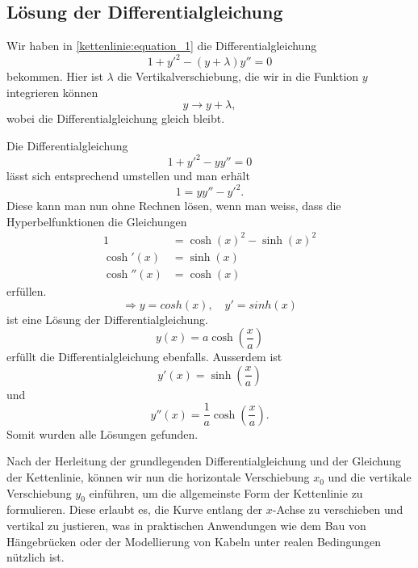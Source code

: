 \subsection{Lösung der Differentialgleichung
\label{kettenlinie:subsection:Lösung der Differentialgleichung}}
Wir haben in \eqref{kettenlinie:equation_1} die Differentialgleichung
\begin{equation}
	1 + y'^2 - (y + \lambda) y''
	=
	0
\end{equation}
bekommen.
Hier ist \(\lambda\) die Vertikalverschiebung, die wir in die Funktion \(y\) integrieren können
\begin{equation}
	y
	\rightarrow
	y + \lambda ,
\end{equation}
wobei die Differentialgleichung gleich bleibt.

Die Differentialgleichung
\begin{equation}
	1 + y'^2 - y y''
	=
	0
\end{equation}
lässt sich entsprechend umstellen und man erhält
\begin{equation}
	1
	=
	y y'' - y'^2.
\end{equation}
Diese kann man nun ohne Rechnen lösen, wenn man weiss, dass die Hyperbelfunktionen die Gleichungen
\begin{align*}
	1 &= \cosh(x)^2 - \sinh(x)^2 \\
	\cosh'(x) &= \sinh(x) \\
	\cosh''(x) &= \cosh(x)
\end{align*}
erfüllen.
\begin{equation}
	\Rightarrow
	y
	=
	cosh(x), \quad
	y'
	=
	sinh(x)
\end{equation}
ist eine Lösung der Differentialgleichung.
\begin{equation}
	y(x)
	=
	a \cosh\left(\frac{x}{a}\right)
\end{equation}
erfüllt die Differentialgleichung ebenfalls. Ausserdem ist 
\begin{equation}
	y'(x)
	=
	\sinh\left(\frac{x}{a}\right)
\end{equation}
und
\begin{equation}
	y''(x)
	=
	\frac{1}{a} \cosh\left(\frac{x}{a}\right).
\end{equation}
Somit wurden alle Lösungen gefunden.

Nach der Herleitung der grundlegenden Differentialgleichung und der Gleichung der Kettenlinie, können wir nun die horizontale Verschiebung \(x_0\) und die vertikale Verschiebung \(y_0\) einführen, um die allgemeinste Form der Kettenlinie zu formulieren.
Diese erlaubt es, die Kurve entlang der \(x\)-Achse zu verschieben und vertikal zu justieren, was in praktischen Anwendungen wie dem Bau von Hängebrücken oder der Modellierung von Kabeln unter realen Bedingungen nützlich ist.

